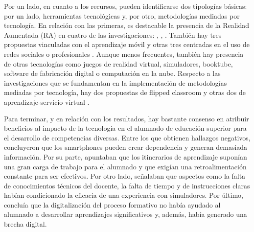 Por un lado, en cuanto a los recursos, pueden identificarse dos
tipologías básicas: por un lado, herramientas tecnológicas y, por otro,
metodologías mediadas por tecnología. En relación con las primeras, es
destacable la presencia de la Realidad Aumentada (RA) en cuatro de las
investigaciones: \textcite{fernandez2023b}, \textcite{martinez2021},
\textcite{higaldocajo2021}. También hay tres
propuestas vinculadas con el aprendizaje móvil \cite{diazramirez2023,lopeznoguero2023,soncco2022} y otras tres centradas
en el uso de redes sociales o profesionales \cite{delacruz2021,ramos2022,rodrigo2022}. Aunque menos frecuentes, también hay
presencia de otras tecnologías como juegos de realidad virtual,
simuladores, booktube, software de fabricación digital o computación en
la nube. Respecto a las investigaciones que se fundamentan en la
implementación de metodologías mediadas por tecnología, hay dos
propuestas de flipped classroom \cite{andrade2022,blasco2022} y otras dos de aprendizaje-servicio
virtual \cite{cordero2021,gomez-gomez2021}.

Para terminar, y en relación con los resultados, hay bastante consenso
en atribuir beneficios al impacto de la tecnología en el alumnado de
educación superior para el desarrollo de competencias diversas. Entre
los que obtienen hallazgos negativos, \textcite{lopeznoguero2023}
concluyeron que los smartphones pueden crear dependencia y generan
demasiada información. Por su parte, \textcite{villatoro2022}
apuntaban que los itinerarios de aprendizaje suponían una gran carga de
trabajo para el alumnado y que exigían una retroalimentación constante
para ser efectivos. Por otro lado, \textcite{maldonadotorres2021}
señalaban que aspectos como la falta de conocimientos técnicos del
docente, la falta de tiempo y de instrucciones claras habían
condicionado la eficacia de una experiencia con simuladores. Por último,
\textcite{astudillo2021} concluía que la digitalización del proceso formativo no
había ayudado al alumnado a desarrollar aprendizajes significativos y,
además, había generado una brecha digital.

